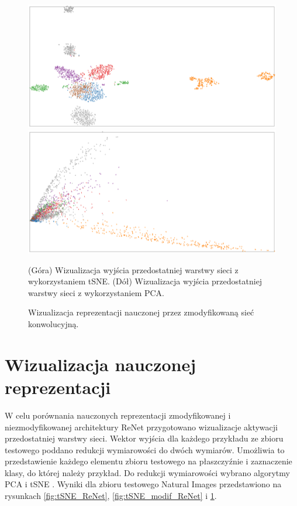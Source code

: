 \documentclass[oneside, mag]{mgr}
\begin{document}
\begin{figure}
\centering
	\includegraphics[width=1.0\textwidth]{img/tSNE_conv.png}
	\includegraphics[width=1.0\textwidth]{img/PCA_conv.png}
	\caption{Wizualizacja reprezentacji nauczonej przez zmodyfikowaną sieć konwolucyjną.} (Góra) Wizualizacja wyjścia przedostatniej warstwy sieci z wykorzystaniem tSNE. (Dół) Wizualizacja wyjścia przedostatniej warstwy sieci z wykorzystaniem PCA.
	\label{fig:tSNE_conv}
\end{figure}

\section{Wizualizacja nauczonej reprezentacji}

W celu porównania nauczonych reprezentacji zmodyfikowanej i niezmodyfikowanej architektury ReNet przygotowano wizualizacje aktywacji przedostatniej warstwy sieci. Wektor wyjścia dla każdego przykładu ze zbioru testowego poddano redukcji wymiarowości do dwóch wymiarów. Umożliwia to przedstawienie każdego elementu zbioru testowego na płaszczyźnie i zaznaczenie klasy, do której należy przykład. Do redukcji wymiarowości wybrano algorytmy PCA i tSNE \cite{tSNE}. Wyniki dla zbioru testowego Natural Images przedstawiono na rysunkach \ref{fig:tSNE_ReNet}, \ref{fig:tSNE_modif_ReNet} i \ref{fig:tSNE_conv}.
\end{document}
